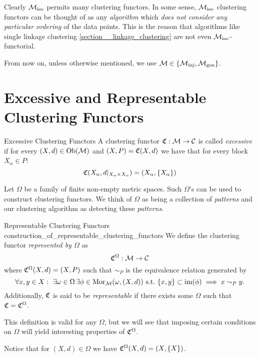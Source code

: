 Clearly ${\mathcal{M}_\mathrm{iso}}$ permits many clustering functors.
In some sense, ${\mathcal{M}_\mathrm{iso}}$ clustering functors can be thought of as any \emph{algorithm} which \emph{does not consider any particular ordering} of the data points.
This is the reason that algorithms like single linkage clustering \ref{section__linkage_clustering} are not even ${\mathcal{M}_\mathrm{iso}}$-functorial.

From now on, unless otherwise mentioned, we use $\mathcal{M} \in \{{\mathcal{M}_\mathrm{inj}}, {\mathcal{M}_\mathrm{gen}}\}$.

\section{Excessive and Representable Clustering Functors}
\begin{definition}{Excessive Clustering Functors \cite[Def.~6.2]{Carlsson2010}}{}
A clustering functor $\mathfrak{C}: \mathcal{M} \to \mathcal{C}$ is called \emph{excessive} if for every $(X,d) \in \mathrm {Ob}(\mathcal{M})$ and $(X,P) = \mathfrak{C}(X,d)$ we have that for every block $X_\alpha \in P$:
$$
\mathfrak{C}(X_\alpha, d|_{X_\alpha \times X_\alpha}) = (X_\alpha, \{X_\alpha\})
$$
\end{definition}

Let $\Omega$ be a family of finite non-empty metric spaces. Such $\Omega$'s can be used to construct clustering functors. We think of $\Omega$ as being a collection of \emph{patterns} and our clustering algorithm as detecting these \emph{patterns}.



\begin{definition}{Representable Clustering Functors \cite[Sec.~6.2]{Carlsson2010}}{construction_of_representable_clustering_functors}
We define the clustering functor \emph{represented by $\Omega$} as
$$
\mathfrak{C}^\Omega: \mathcal{M} \to \mathcal{C}
$$
where $\mathfrak{C}^\Omega(X,d) = (X, P)$ such that $\sim_P$ 
is the equivalence relation generated by
\begin{equation*}
    \forall x,y \in X: \ \exists \omega \in \Omega \,\exists \phi \in \mathrm {Mor}_{\mathcal{M}}(\omega, (X,d)) \ \text{s.t.} \ \{x,y\} \subset \operatorname*{im}(\phi) \implies x \sim_P y.
\end{equation*}
Additionally, $\mathfrak{C}$ is said to be \emph{representable} if there exists some $\Omega$ such that $\mathfrak{C} = \mathfrak{C}^\Omega$.
\end{definition}

This definition is valid for any $\Omega$, but we will see that imposing certain conditions on $\Omega$ will yield interesting properties of $\mathfrak{C}^\Omega$.

\begin{myremark}{\cite[Rem.~6.3]{Carlsson2010}}{}
Notice that for $(X,d) \in \Omega$ we have $\mathfrak{C}^\Omega(X,d) = (X, \{X\})$.
\end{myremark}

